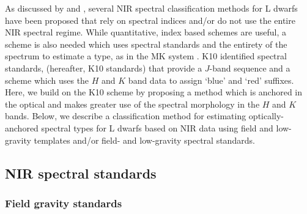 \documentclass[12pt,preprint]{aastex}
\begin{document}
As discussed by \citet[\S~3.2]{Kirkpatrick05} and \citet[hereafter K10]{Kirkpatrick10}, several NIR spectral classification methods for L dwarfs have been proposed that rely on spectral indices and/or do not use the entire NIR spectral regime.
While quantitative, index based schemes are useful, a scheme is also needed which uses spectral standards and the entirety of the spectrum to estimate a type, as in the MK system \citep{Morgan:1984wy}.
K10 identified spectral standards, (hereafter, K10 standards) that provide a $J$-band sequence and a scheme which uses the $H$ and $K$ band data to assign `blue' and `red' suffixes. 
Here, we build on the K10 scheme by proposing a method which is anchored in the optical and makes greater use of the spectral morphology in the $H$ and $K$ bands.
Below, we describe a classification method for estimating optically-anchored spectral types for L dwarfs based on NIR data using field and low-gravity templates and/or field- and low-gravity spectral standards.



\subsection{NIR spectral standards}
\subsubsection{Field gravity standards}
\label{sec:field_stds}
\end{document}

